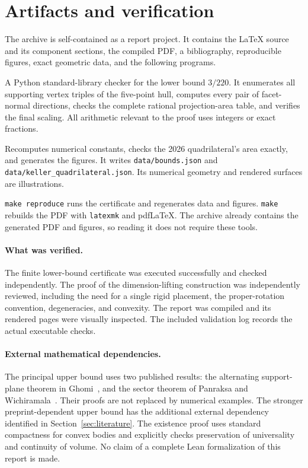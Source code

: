 \section{Artifacts and verification}\label{sec:reproduce}

The archive is self-contained as a report project. It contains the
LaTeX source and its component sections, the compiled PDF, a bibliography,
reproducible figures, exact geometric data, and the following programs.

\begin{description}[style=nextline,leftmargin=1.5em]
\item[\texttt{code/verify\_lower\_bound.py}]
A Python standard-library checker for the lower bound $3/220$. It
enumerates all supporting vertex triples of the five-point hull, computes
every pair of facet-normal directions, checks the complete rational
projection-area table, and verifies the final scaling. All arithmetic
relevant to the proof uses integers or exact fractions.

\item[\texttt{code/reproduce.py}]
Recomputes numerical constants, checks the 2026 quadrilateral's area
exactly, and generates the figures. It writes
\texttt{data/bounds.json} and \texttt{data/keller\_quadrilateral.json}.
Its numerical geometry and rendered surfaces are illustrations.

\item[\texttt{Makefile} and \texttt{requirements.txt}]
\texttt{make reproduce} runs the certificate and regenerates data and
figures. \texttt{make} rebuilds the PDF with \texttt{latexmk} and pdfLaTeX.
The archive already contains the generated PDF and figures, so reading
it does not require these tools.
\end{description}

\paragraph{What was verified.}
The finite lower-bound certificate was executed successfully and checked
independently. The proof of the dimension-lifting construction was
independently reviewed, including the need for a single rigid placement,
the proper-rotation convention, degeneracies, and convexity.
The report was compiled and its rendered pages were visually inspected.
The included validation log records the actual executable checks.

\paragraph{External mathematical dependencies.}
The principal upper bound uses two published results: the alternating
support-plane theorem in Ghomi~\cite{Ghomi2018}, and the sector theorem
of Panraksa and Wichiramala~\cite{PW2021}. Their proofs are not replaced
by numerical examples. The stronger preprint-dependent upper bound has
the additional external dependency identified in
Section~\ref{sec:literature}. The existence proof uses standard compactness
for convex bodies and explicitly checks preservation of universality
and continuity of volume. No claim of a complete Lean formalization
of this report is made.

